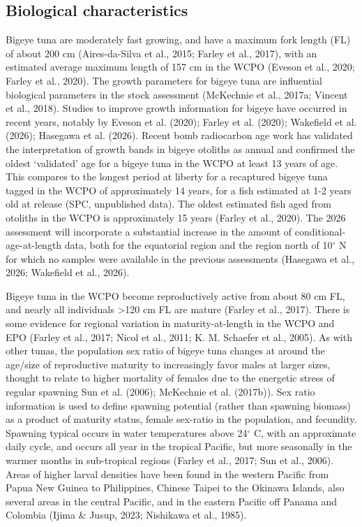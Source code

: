 \documentclass[
  english,
  a4paper,
  a4paper,
  11pt]{SCreport}
\begin{document}
\subsection{Biological characteristics}\label{sec-biology}

Bigeye tuna are moderately fast growing, and have a maximum fork length
(FL) of about 200 cm (Aires-da-Silva et al., 2015; Farley et al., 2017),
with an estimated average maximum length of 157 cm in the WCPO (Eveson
et al., 2020; Farley et al., 2020). The growth parameters for bigeye
tuna are influential biological parameters in the stock assessment
(McKechnie et al., 2017a; Vincent et al., 2018). Studies to improve
growth information for bigeye have occurred in recent years, notably by
Eveson et al. (2020); Farley et al. (2020); Wakefield et al. (2026);
Hasegawa et al. (2026). Recent bomb radiocarbon age work has validated
the interpretation of growth bands in bigeye otoliths as annual and
confirmed the oldest `validated' age for a bigeye tuna in the WCPO at
least 13 years of age. This compares to the longest period at liberty
for a recaptured bigeye tuna tagged in the WCPO of approximately 14
years, for a fish estimated at 1-2 years old at release (SPC,
unpublished data). The oldest estimated fish aged from otoliths in the
WCPO is approximately 15 years (Farley et al., 2020). The 2026
assessment will incorporate a substantial increase in the amount of
conditional-age-at-length data, both for the equatorial region and the
region north of 10\(^\circ\) N for which no samples were available in
the previous assessments (Hasegawa et al., 2026; Wakefield et al.,
2026).

Bigeye tuna in the WCPO become reproductively active from about 80 cm
FL, and nearly all individuals \textgreater120 cm FL are mature (Farley
et al., 2017). There is some evidence for regional variation in
maturity-at-length in the WCPO and EPO (Farley et al., 2017; Nicol et
al., 2011; K. M. Schaefer et al., 2005). As with other tunas, the
population sex ratio of bigeye tuna changes at around the age/size of
reproductive maturity to increasingly favor males at larger sizes,
thought to relate to higher mortality of females due to the energetic
stress of regular spawning Sun et al. (2006); McKechnie et al. (2017b)).
Sex ratio information is used to define spawning potential (rather than
spawning biomass) as a product of maturity status, female sex-ratio in
the population, and fecundity. Spawning typical occurs in water
temperatures above 24\(^\circ\) C, with an approximate daily cycle, and
occurs all year in the tropical Pacific, but more seasonally in the
warmer months in sub-tropical regions (Farley et al., 2017; Sun et al.,
2006). Areas of higher larval densities have been found in the western
Pacific from Papua New Guinea to Philippines, Chinese Taipei to the
Okinawa Islands, also several areas in the central Pacific, and in the
eastern Pacific off Panama and Colombia (Ijima \& Jusup, 2023; Nishikawa
et al., 1985).
\end{document}
